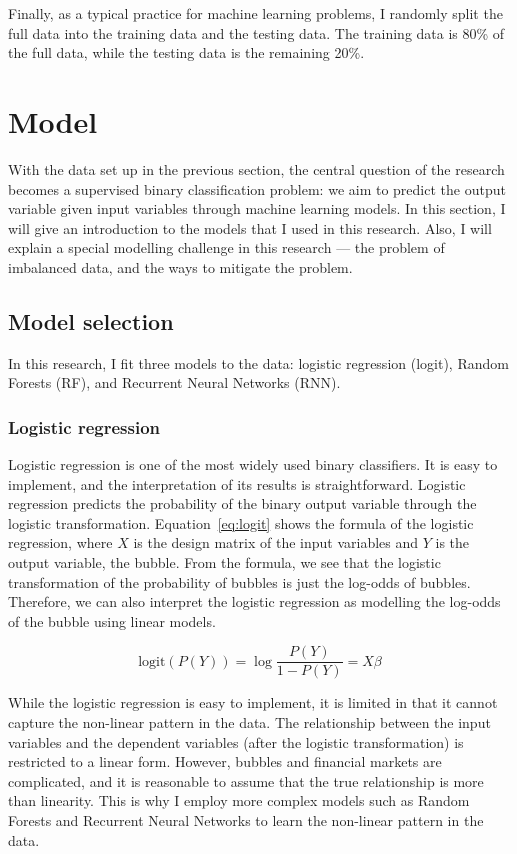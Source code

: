 \documentclass[12pt, man, a4paper, floatsintext]{apa7}
\begin{document}
Finally, as a typical practice for machine learning problems, I randomly split the full data into the training data and the testing data. The training data is 80\% of the full data, while the testing data is the remaining 20\%.

    \section{Model}

With the data set up in the previous section, the central question of the research becomes a supervised binary classification problem: we aim to predict the output variable given input variables through machine learning models. In this section, I will give an introduction to the models that I used in this research. Also, I will explain a special modelling challenge in this research — the problem of imbalanced data, and the ways to mitigate the problem.

\subsection{Model selection}

In this research, I fit three models to the data: logistic regression (logit), Random Forests (RF), and Recurrent Neural Networks (RNN).

\subsubsection{Logistic regression}

Logistic regression is one of the most widely used binary classifiers. It is easy to implement, and the interpretation of its results is straightforward. Logistic regression predicts the probability of the binary output variable through the logistic transformation. Equation~\ref{eq:logit} shows the formula of the logistic regression, where $X$ is the design matrix of the input variables and $Y$ is the output variable, the bubble. From the formula, we see that the logistic transformation of the probability of bubbles is just the log-odds of bubbles. Therefore, we can also interpret the logistic regression as modelling the log-odds of the bubble using linear models. 

\begin{equation}
    \text{logit}(P(Y)) = \log{\frac{P(Y)}{1-P(Y)}} = X \beta
    \label{eq:logit}
\end{equation}

While the logistic regression is easy to implement, it is limited in that it cannot capture the non-linear pattern in the data. The relationship between the input variables and the dependent variables (after the logistic transformation) is restricted to a linear form. However, bubbles and financial markets are complicated, and it is reasonable to assume that the true relationship is more than linearity. This is why I employ more complex models such as Random Forests and Recurrent Neural Networks to learn the non-linear pattern in the data.
\end{document}
